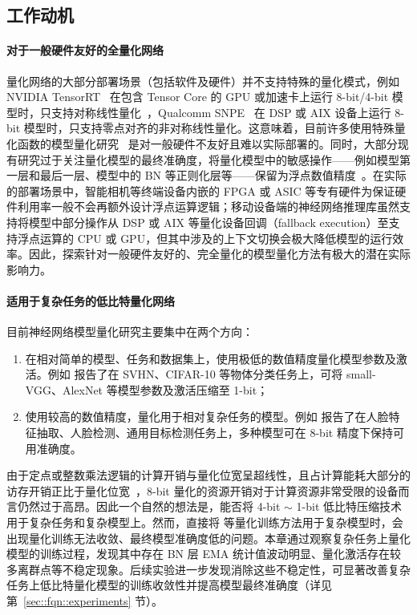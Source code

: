\documentclass[
  fontset = mac,
]{shtthesis}
\begin{document}
\subsection{工作动机}
\paragraph{对于一般硬件友好的全量化网络}
量化网络的大部分部署场景（包括软件及硬件）并不支持特殊的量化模式，例如 NVIDIA TensorRT~\citep{vanholder2016efficient} 在包含 Tensor Core 的 GPU 或加速卡上运行 8-bit/4-bit 模型时，只支持对称线性量化~\citep{migacz20178}，Qualcomm SNPE~\citep{qualcomm2019snpe} 在 DSP 或 AIX 设备上运行 8-bit 模型时，只支持零点对齐的非对称线性量化。这意味着，目前许多使用特殊量化函数的模型量化研究~\citep{zhu2016trained, cai2017deep, Zhang_2018} 是对一般硬件不友好且难以实际部署的。同时，大部分现有研究过于关注量化模型的最终准确度，将量化模型中的敏感操作——例如模型第一层和最后一层、模型中的 BN 等正则化层等——保留为浮点数值精度~\citep{zhou2016dorefanet, Zhang_2018, li2019additive}。在实际的部署场景中，智能相机等终端设备内嵌的 FPGA 或 ASIC 等专有硬件为保证硬件利用率一般不会再额外设计浮点运算逻辑；移动设备端的神经网络推理库虽然支持将模型中部分操作从 DSP 或 AIX 等量化设备回调（fallback execution）至支持浮点运算的 CPU 或 GPU，但其中涉及的上下文切换会极大降低模型的运行效率。因此，探索针对一般硬件友好的、完全量化的模型量化方法有极大的潜在实际影响力。

\paragraph{适用于复杂任务的低比特量化网络}
目前神经网络模型量化研究主要集中在两个方向：
\begin{enumerate}[1)]
  \item 在相对简单的模型、任务和数据集上，使用极低的数值精度量化模型参数及激活。例如 \citet{hubara2016binarized, zhou2016dorefanet} 报告了在 SVHN、CIFAR-10 等物体分类任务上，可将 small-VGG、AlexNet 等模型参数及激活压缩至 1-bit；
  \item 使用较高的数值精度，量化用于相对复杂任务的模型。例如 \citet{jacob2018quantization} 报告了在人脸特征抽取、人脸检测、通用目标检测任务上，多种模型可在 8-bit 精度下保持可用准确度。
\end{enumerate}

由于定点或整数乘法逻辑的计算开销与量化位宽呈超线性，且占计算能耗大部分的访存开销正比于量化位宽~\citep{han2017efficient}，8-bit 量化的资源开销对于计算资源非常受限的设备而言仍然过于高昂。因此一个自然的想法是，能否将 4-bit $\sim$ 1-bit 低比特压缩技术用于复杂任务和复杂模型上。然而，直接将 \citet{rastegari2016xnor, zhou2016dorefanet} 等量化训练方法用于复杂模型时，会出现量化训练无法收敛、最终模型准确度低的问题。本章通过观察复杂任务上量化模型的训练过程，发现其中存在 BN 层 EMA 统计值波动明显、量化激活存在较多离群点等不稳定现象。后续实验进一步发现消除这些不稳定性，可显著改善复杂任务上低比特量化模型的训练收敛性并提高模型最终准确度（详见第~\ref{sec::fqn::experiments} 节）。
\end{document}
